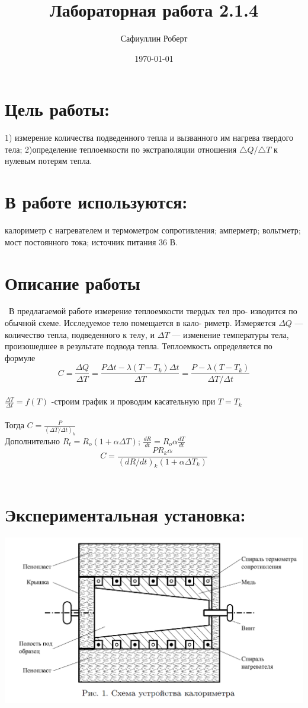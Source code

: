 \documentclass[a4paper,12pt]{article} %
\author{Сафиуллин Роберт	}
\title{Лабораторная работа 2.1.4}
\date{\today}
\begin{document}

\maketitle


\newpage
\section{Цель работы:}
1) измерение количества подведенного тепла и вызванного им нагрева твердого тела; 2)определение теплоемкости по экстраполяции отношения  $\triangle Q / \triangle T$ к нулевым потерям тепла.\\
\section{В работе используются:}
 калориметр с нагревателем и термометром сопротивления; амперметр; вольтметр; мост постоянного тока; источник питания 36 В.
 \section*{Описание работы}\
\indent В предлагаемой работе измерение теплоемкости твердых тел про- изводится по обычной схеме. Исследуемое тело помещается в кало- риметр. Измеряется $\Delta Q$ — количество тепла, подведенного к телу, и $\Delta T$ — изменение температуры тела, произошедшее в результате подвода тепла. Теплоемкость определяется по формуле\\
$$C=\frac{\Delta Q}{\Delta T}=\frac{P\Delta t - \lambda (T-T_k)\Delta t}{\Delta T}=\frac{P - \lambda (T-T_k)}{\Delta T/\Delta t}$$
\ \\
$\frac{\Delta T}{\Delta t}=f(T)$ -строим график и проводим касательную при $T=T_k$\\
\ \\
Тогда $C=\frac{P}{(\Delta T/\Delta t)_k}$\\
Дополнительно $R_t=R_o(1+\alpha\Delta T)$; $\frac{dR}{dt}=R_o\alpha\frac{dT}{dt}$\\
$$C=\frac{PR_k\alpha}{(dR/dt)_k(1+\alpha\Delta T_k)}$$
\ \\
\newpage
\section{Экспериментальная установка:}
\includegraphics[scale=0.7]{ust}
\end{document}
